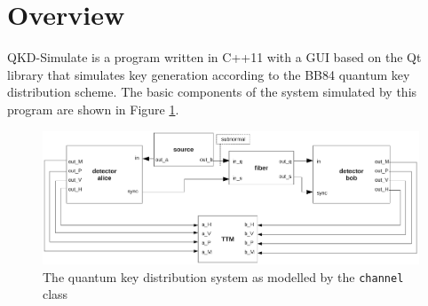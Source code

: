 \section{Overview}
\label{sec:overview}

QKD-Simulate is a program written in C++11 with a GUI based on the Qt library that simulates key generation according to the BB84 quantum key distribution scheme. The basic components of the system simulated by this program are shown in Figure \ref{fig:quantum_channel}.

\begin{figure}[h]
\centering
\includegraphics[scale=0.65]{drawings/channel.pdf}
\caption{The quantum key distribution system as modelled by the \texttt{channel} class}
\label{fig:quantum_channel}
\end{figure}

